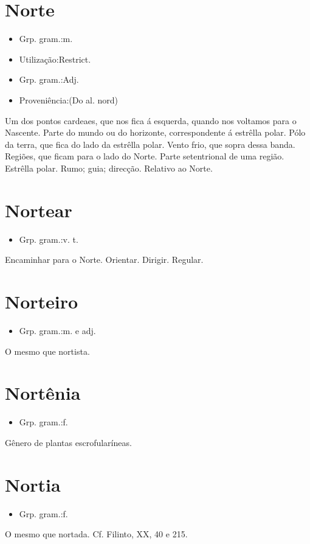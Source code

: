 \section{Norte}
\begin{itemize}
\item {Grp. gram.:m.}
\end{itemize}
\begin{itemize}
\item {Utilização:Restrict.}
\end{itemize}
\begin{itemize}
\item {Grp. gram.:Adj.}
\end{itemize}
\begin{itemize}
\item {Proveniência:(Do al. \textunderscore nord\textunderscore )}
\end{itemize}
Um dos pontos cardeaes, que nos fica á esquerda, quando nos voltamos para o Nascente.
Parte do mundo ou do horizonte, correspondente á estrêlla polar.
Pólo da terra, que fica do lado da estrêlla polar.
Vento frio, que sopra dessa banda.
Regiões, que ficam para o lado do Norte.
Parte setentrional de uma região.
Estrêlla polar.
Rumo; guia; direcção.
Relativo ao Norte.
\section{Nortear}
\begin{itemize}
\item {Grp. gram.:v. t.}
\end{itemize}
Encaminhar para o Norte.
Orientar.
Dirigir.
Regular.
\section{Norteiro}
\begin{itemize}
\item {Grp. gram.:m.  e  adj.}
\end{itemize}
O mesmo que \textunderscore nortista\textunderscore .
\section{Nortênia}
\begin{itemize}
\item {Grp. gram.:f.}
\end{itemize}
Gênero de plantas escrofularíneas.
\section{Nortia}
\begin{itemize}
\item {Grp. gram.:f.}
\end{itemize}
O mesmo que \textunderscore nortada\textunderscore . Cf. \textunderscore Filinto\textunderscore , XX, 40 e 215.
